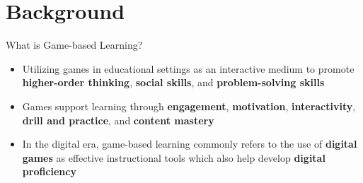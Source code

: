 \documentclass{beamer}
\begin{document}
	\section{Background}
	\begin{frame}{What is Game-based Learning?}
		\label{link1}
		
		\begin{itemize}
			\item Utilizing games in educational settings as an interactive medium to promote {\color{blue}\textbf{higher-order thinking}}, {\color{blue}\textbf{social skills}}, and {\color{blue}\textbf{problem-solving skills}} \newline
			\item Games support learning through {\color{blue}\textbf{engagement}}, {\color{blue}\textbf{motivation}}, {\color{blue}\textbf{interactivity}}, 
			{\color{blue}\textbf{drill and practice}}, and {\color{blue}\textbf{content mastery}} \newline
			\item In the digital era, game-based learning commonly refers to the use of {\color{blue}\textbf{digital games}} as effective instructional tools which also help develop {\color{blue}\textbf{digital proficiency}} 
			
		\end{itemize}
		
	\end{frame}

		
		
\end{document}
